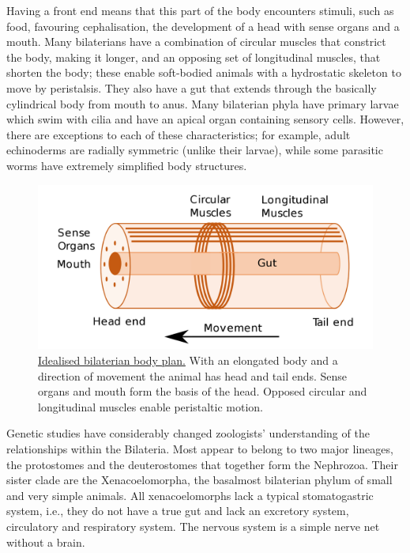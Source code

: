 Having a front end means that this part of the body encounters stimuli, such as food, favouring cephalisation, the development of a head with sense organs and a mouth. Many bilaterians have a combination of circular muscles that constrict the body, making it longer, and an opposing set of longitudinal muscles, that shorten the body; these enable soft-bodied animals with a hydrostatic skeleton to move by peristalsis. They also have a gut that extends through the basically cylindrical body from mouth to anus. Many bilaterian phyla have primary larvae which swim with cilia and have an apical organ containing sensory cells. However, there are exceptions to each of these characteristics; for example, adult echinoderms are radially symmetric (unlike their larvae), while some parasitic worms have extremely simplified body structures.



\begin{figure}

{\centering \includegraphics[width=0.7\linewidth]{./figures/animals/Bilaterian_body_plan} 

}

\caption{\href{https://commons.wikimedia.org/wiki/File:Bilaterian_body_plan.svg}{Idealised bilaterian body plan.} With an elongated body and a direction of movement the animal has head and tail ends. Sense organs and mouth form the basis of the head. Opposed circular and longitudinal muscles enable peristaltic motion.}\label{fig:bilaterianbodyplan}
\end{figure}

Genetic studies have considerably changed zoologists' understanding of the relationships within the Bilateria. Most appear to belong to two major lineages, the protostomes and the deuterostomes that together form the Nephrozoa. Their sister clade are the Xenacoelomorpha, the basalmost bilaterian phylum of small and very simple animals. All xenacoelomorphs lack a typical stomatogastric system, i.e., they do not have a true gut and lack an excretory system, circulatory and respiratory system. The nervous system is a simple nerve net without a brain.



